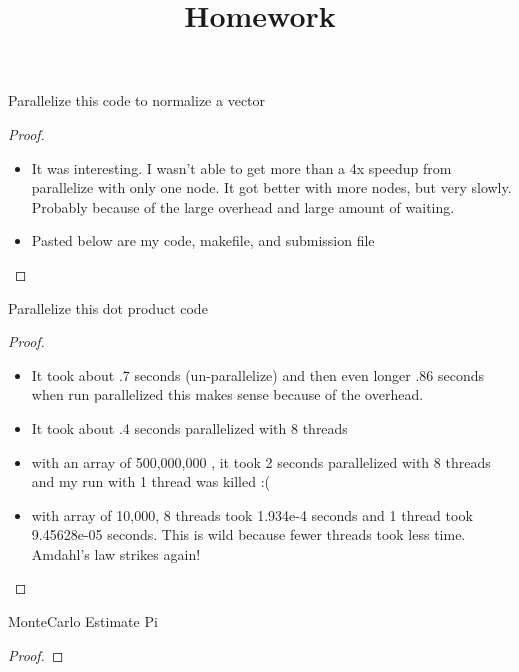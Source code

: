\documentclass[12pt]{article}
\title{Homework}
\newenvironment{problem}[2][Problem]{\begin{trivlist}
\item[\hskip \labelsep {\bfseries #1}\hskip \labelsep {\bfseries #2.}]}{\end{trivlist}}
\begin{document}
\begin{problem}{1}
Parallelize this code to normalize a vector
\end{problem}
\begin{proof}
\begin{itemize}
\item It was interesting. I wasn't able to get more than a 4x speedup from parallelize with only one node.
It got better with more nodes, but very slowly. Probably because of the large overhead and large amount of waiting.
\item Pasted below are my code, makefile, and submission file
\end{itemize}




\end{proof}
\begin{problem}{2}
Parallelize this dot product code
\end{problem}
\begin{proof}
\begin{itemize}
\item It took about .7 seconds (un-parallelize) and then even longer .86 seconds when run parallelized
this makes sense because of the overhead.
\item It took about .4 seconds parallelized with 8 threads
\item with an array of 500,000,000 , it took 2 seconds parallelized with 8 threads and my run with 1 thread was killed :(
\item with array of 10,000, 8 threads took 1.934e-4 seconds and 1 thread took 9.45628e-05 seconds. This is wild because fewer threads took less time. Amdahl's law strikes again!
\end{itemize}

\end{proof}

\begin{problem}{3}
MonteCarlo Estimate Pi
\end{problem}
\begin{proof}

\end{proof}
\end{document}

